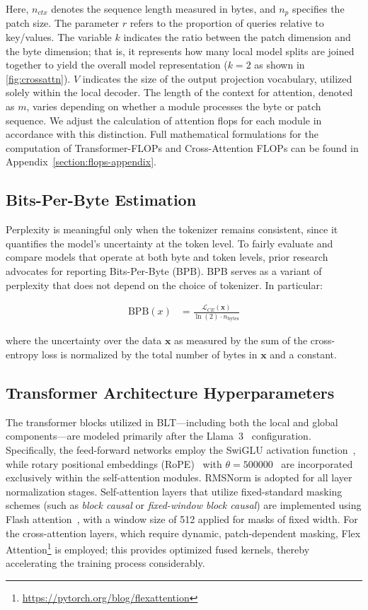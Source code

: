 Here, $n_{ctx}$ denotes the sequence length measured in bytes, and $n_p$ specifies the patch size. The parameter $r$ refers to the proportion of queries relative to key/values. The variable $k$ indicates the ratio between the patch dimension and the byte dimension; that is, it represents how many local model splits are joined together to yield the overall model representation ($k=2$ as shown in \autoref{fig:crossattn}). $V$ indicates the size of the output projection vocabulary, utilized solely within the local decoder. The length of the context for attention, denoted as $m$, varies depending on whether a module processes the byte or patch sequence. We adjust the calculation of attention flops for each module in accordance with this distinction. Full mathematical formulations for the computation of Transformer-FLOPs and Cross-Attention FLOPs can be found in Appendix~\ref{section:flops-appendix}.

\subsection{Bits-Per-Byte Estimation} Perplexity is meaningful only when the tokenizer remains consistent, since it quantifies the model’s uncertainty at the token level. To fairly evaluate and compare models that operate at both byte and token levels, prior research~\citep{xue2022byt5, yu2023megabyte, wang2024mambabyte} advocates for reporting Bits-Per-Byte (BPB). BPB serves as a variant of perplexity that does not depend on the choice of tokenizer. In particular:

\begin{align}
    \text{BPB}(x)&= \frac{\mathcal{L}_{CE}(\pmb{x})}{\ln(2)\cdot n_{\text{bytes}}}
\end{align}

where the uncertainty over the data $\pmb{x}$ as measured by the sum of the cross-entropy loss is normalized by the total number of bytes in $\pmb{x}$ and a constant. 

\subsection{Transformer Architecture Hyperparameters} The transformer blocks utilized in {\textsc BLT}—including both the local and global components—are modeled primarily after the Llama~3~\citep{dubey2024llama} configuration. Specifically, the feed-forward networks employ the SwiGLU activation function~\citep{swiglu}, while rotary positional embeddings (RoPE)~\citep{RoPe} with $\theta=500000$~\citep{xiong2024effective} are incorporated exclusively within the self-attention modules. RMSNorm \citep{RMSNorm} is adopted for all layer normalization stages. Self-attention layers that utilize fixed-standard masking schemes (such as \textit{block causal} or \textit{fixed-window block causal}) are implemented using Flash attention~\citep{dao2022flashattention}, with a window size of 512 applied for masks of fixed width. For the cross-attention layers, which require dynamic, patch-dependent masking, Flex Attention\footnote{\url{https://pytorch.org/blog/flexattention}} is employed; this provides optimized fused kernels, thereby accelerating the training process considerably.


